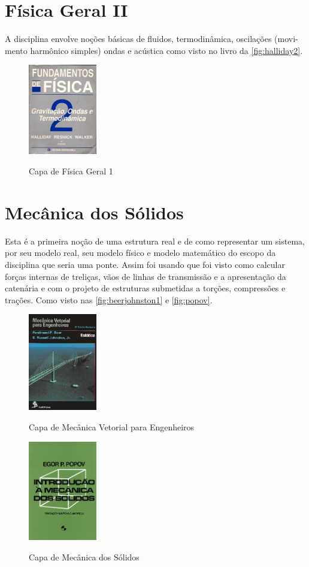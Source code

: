 \documentclass[
	12pt,				%
	openright,			%
	oneside,			%
	a4paper,			%
	english,			%
	french,				%
	spanish,			%
	brazil				%
	]{abntex2}
\begin{document}
\section{Física Geral II}\label{sec:fge2}
A disciplina envolve noções básicas de fluidos, termodinâmica, oscilações (movi-
mento harmônico simples) ondas e acústica como visto no livro da \autoref{fig:halliday2}.
\begin{figure}[!htb]
	\caption{Capa de Física Geral 1}
	\centering
	\includegraphics[width=3cm]{halliday2.jpg}
	\label{fig:halliday2}
\end{figure}

\section{Mecânica dos Sólidos}\label{sec:mso}
Esta é a primeira noção de uma estrutura real e de como representar um sistema, por seu modelo real, seu modelo físico e modelo matemático do escopo da disciplina que seria uma ponte. Assim foi usando  que foi visto como calcular forças internas de treliças, vãos de linhas de transmissão e a apresentação da catenária e com  o projeto de estruturas submetidas a torções, compressões e trações. Como visto nas \autoref{fig:beerjohnston1} e \autoref{fig:popov}.

\begin{figure}[!htb]
	\caption{Capa de Mecânica Vetorial para Engenheiros}
	\centering
	\includegraphics[width=3cm]{beerjohnston1.jpg}
	\label{fig:beerjohnston1}
\end{figure}
\begin{figure}[!htb]
	\caption{Capa de Mecânica dos Sólidos}
	\centering
	\includegraphics[width=3cm]{popov.jpg}
	\label{fig:popov}
\end{figure}
\end{document}
